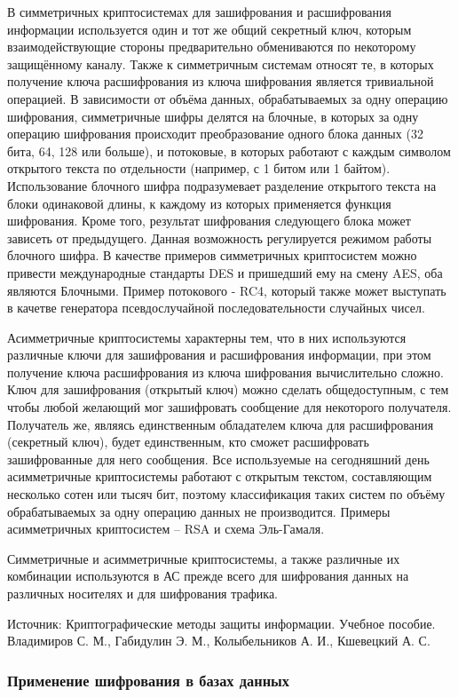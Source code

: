 В симметричных криптосистемах для зашифрования и расшифрования информации используется один и тот же общий секретный ключ, которым взаимодействующие стороны предварительно обмениваются по некоторому защищённому каналу. Также к симметричным системам относят те, в которых получение ключа расшифрования из ключа шифрования является тривиальной операцией. В зависимости от объёма данных, обрабатываемых за одну операцию шифрования, симметричные шифры делятся на блочные, в которых за одну операцию шифрования происходит преобразование одного блока данных (32 бита, 64, 128 или больше), и потоковые, в которых работают с каждым символом открытого текста по отдельности (например, с 1 битом или 1 байтом). Использование блочного шифра подразумевает разделение открытого текста на блоки одинаковой длины, к каждому из которых применяется функция шифрования. Кроме того, результат шифрования следующего блока может зависеть от предыдущего. Данная возможность регулируется режимом работы блочного шифра. В качестве примеров симметричных криптосистем можно привести международные стандарты DES и пришедший ему на смену AES, оба являются Блочными. Пример потокового - RC4, который также может выступать в качетве генератора псевдослучайной последовательности случайных чисел.

Асимметричные криптосистемы характерны тем, что в них используются различные ключи для зашифрования и расшифрования информации, при этом получение ключа расшифрования из ключа шифрования  вычислительно сложно. Ключ для зашифрования (открытый ключ) можно сделать общедоступным, с тем чтобы любой желающий мог зашифровать сообщение для некоторого получателя. Получатель же, являясь единственным обладателем ключа для расшифрования (секретный ключ), будет единственным, кто сможет расшифровать зашифрованные для него сообщения. Все используемые на сегодняшний день асимметричные криптосистемы работают с открытым текстом, составляющим несколько сотен или тысяч бит, поэтому классификация таких систем по объёму обрабатываемых за одну операцию данных не производится. Примеры асимметричных криптосистем – RSA и схема Эль-Гамаля.

Симметричные и асимметричные криптосистемы, а также различные их комбинации используются в АС прежде всего для шифрования данных на различных носителях и для шифрования трафика.

Источник: Криптографические методы защиты информации. Учебное пособие. Владимиров С. М., Габидулин Э. М., Колыбельников А. И., Кшевецкий А. С.

\subsubsection{Применение шифрования в базах данных}


